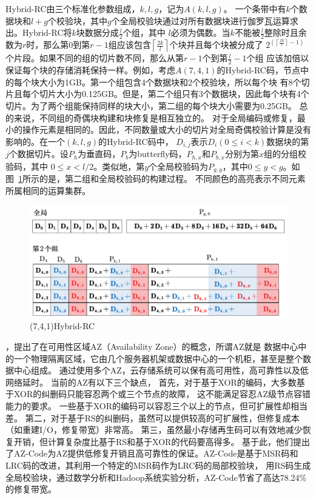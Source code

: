 Hybrid-RC由三个标准化参数组成，$k,l,g$，记为$A(k,l,g)$。
一个条带中有$k$个数据块和$l+g$个校验块，其中$g$个全局校验块通过对所有数据块进行伽罗瓦运算求出。Hybrid-RC将$k$块数据分成$\frac{l}{2}$个组，其中
$l$必须为偶数。当$k$不能被$\frac{l}{2}$整除时且余数为$r$时，那么第0到第$r-1$组应该包含$\left\lceil\frac{2 k}{l}\right\rceil$个块并且每个块被分成了
$2^{\left(\left\lceil\frac{2 k}{l}\right\rceil-1\right)}$个片段。如果不同的组的切片数不同，那么从第$r-1$个到第$\frac{l}{2}-1$个组
应该加倍以保证每个块的存储消耗保持一样。例如，考虑$A(7,4,1)$的Hybrid-RC码，节点中的每个块大小为1GB。第一个组包含4个数据块和2个校验块，所以每个块
有8个切片且每个切片大小为0.125GB。但是，第二个组只有3个数据块，因此每个块有4个切片。为了两个组能保持同样的块大小，第二组的每个块大小需要为0.25GB。
总的来说，不同组的奇偶块构建和块修复是相互独立的。
对于全局编码或修复，最小的操作元素是相同的。因此，不同数量或大小的切片对全局奇偶校验计算是没有影响的。在一个$(k,l,g)$的Hybrid-RC码中，
$D_{i,j}$表示$D_{i}(0 \leq i<k)$数据块的第$j$个数据切片。设$P_h$为垂直码，$P_b$为butterfly码，$P_{h,x}$和$P_{b,x}$分别为第$x$组的分组校验码，其中
$0 \leq x<l / 2$。类似地，第$y$个全局校验码为$P_{g,y}$，其中$0 \leq y < g$。如图~\ref{fig:con-2.1}所示的是，第二组和全局校验码的构建过程。
不同颜色的高亮表示不同元素所属相同的运算集群。

\begin{figure}[htbp]
	\centering
	\includegraphics [scale=0.7]{figures/2.1.pdf}
	\caption{(7,4,1)Hybrid-RC}
	\label{fig:con-2.1}
\end{figure}

\citet{xie2019az}，提出了在可用性区域AZ（Availability Zone）的概念，所谓AZ就是
数据中心中的一个物理隔离区域，它由几个服务器机架或数据中心的一个机柜，甚至是整个数据中心组成。
通过使用多个AZ，云存储系统可以保有高可用性，高可靠性以及低网络延时。
当前的AZ有以下三个缺点，
首先，对于基于XOR的编码，大多数基于XOR的纠删码\citep{corbett2004row,blaum1995evenodd}只能容忍两个或三个节点的故障，
这不能满足容忍AZ级节点容错能力的要求。
一些基于XOR的编码可以容忍三个以上的节点，但可扩展性却相当差\cite{zhang2015tip,huang2008star}。
第二，对于基于RS的纠删码，虽然可以提供较高的可扩展性，但修复成本（如重建I/O，修复带宽）非常高。
第三，虽然最小存储再生码\cite{vajha2018clay,ye2017explicit}可以有效地减少恢复开销，但计算复杂度比基于RS和基于XOR的代码要高得多。
基于此，他们提出了AZ-Code为AZ提供低修复开销且高可靠性的保证。AZ-Code是基于MSR码和LRC码的改进，其利用一个特定的MSR码作为LRC码的局部校验块，
用RS码生成全局校验块，通过数学分析和Hadoop系统实验分析，AZ-Code节省了高达78.24\%的修复带宽。



